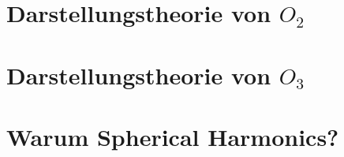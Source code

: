 \documentclass[fontsize=11pt,fleqn,a4paper]{scrartcl}
\begin{document}
\pagebreak
\section{Darstellungstheorie \texorpdfstring{von $O_2$}{der Isometriegruppe der Ebene}}


\pagebreak
\section{Darstellungstheorie \texorpdfstring{von $O_3$}{der Isometriegruppe des dreidimensionalen Raums}}


\pagebreak
\section{Warum Spherical Harmonics?}


\end{document}
